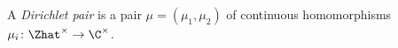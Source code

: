A \emph{Dirichlet pair} is a pair $\mu=(\mu_1,\mu_2)$ of continuous homomorphisms $\mu_i\colon\Zhat^\times\to\C^\times$.
